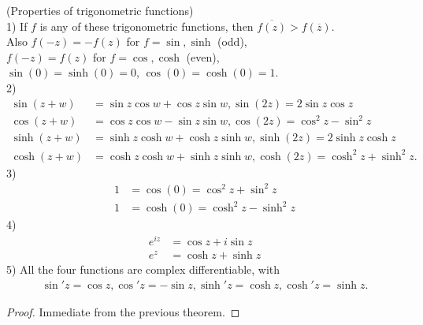 \documentclass[a4paper]{article}
\begin{document}
\begin{prop} (Properties of trigonometric functions)\\
1) If $f$ is any of these trigonometric functions, then $\overline{f\left(z\right)}>f\left(\overline{z}\right)$.\\
Also $f\left(-z\right)=-f\left(z\right)$ for $f=\sin, \sinh$ (odd),\\
$f\left(-z\right)=f\left(z\right)$ for $f=\cos,\cosh$ (even),\\
$\sin\left(0\right) =\sinh\left(0\right) = 0$, $\cos\left(0\right) = \cosh \left(0\right) = 1$.\\

2)
\begin{equation*}
\begin{aligned}
\sin\left(z+w\right)&=\sin z\cos w + \cos z \sin w, \sin\left(2z\right)=2\sin z\cos z\\
\cos\left(z+w\right)&=\cos z\cos w - \sin z \sin w, \cos\left(2z\right)=\cos^2 z-\sin^2 z\\
\sinh \left(z+w\right)&=\sinh z\cosh w + \cosh z\sinh w, \sinh \left(2z\right)=2\sinh z\cosh z\\
\cosh\left(z+w\right)&=\cosh z\cosh w + \sinh z\sinh w, \cosh\left(2z\right)=\cosh^2 z+\sinh^2 z.
\end{aligned}
\end{equation*}
3)
\begin{equation*}
\begin{aligned}
1&=\cos\left(0\right)=\cos^2 z+\sin^2 z\\
1&=\cosh\left(0\right) = \cosh^2 z - \sinh^2 z
\end{aligned}
\end{equation*}
4)
\begin{equation*}
\begin{aligned}
e^{iz} &= \cos z + i\sin z\\
e^z &= \cosh z + \sinh z
\end{aligned}
\end{equation*}
5) All the four functions are complex differentiable, with
\begin{equation*}
\begin{aligned}
\sin'z = \cos z, \cos'z = -\sin z, \sinh'z = \cosh z, \cosh' z= \sinh z.
\end{aligned}
\end{equation*}
\begin{proof} Immediate from the previous theorem.
\end{proof}
\end{prop}
\end{document}
